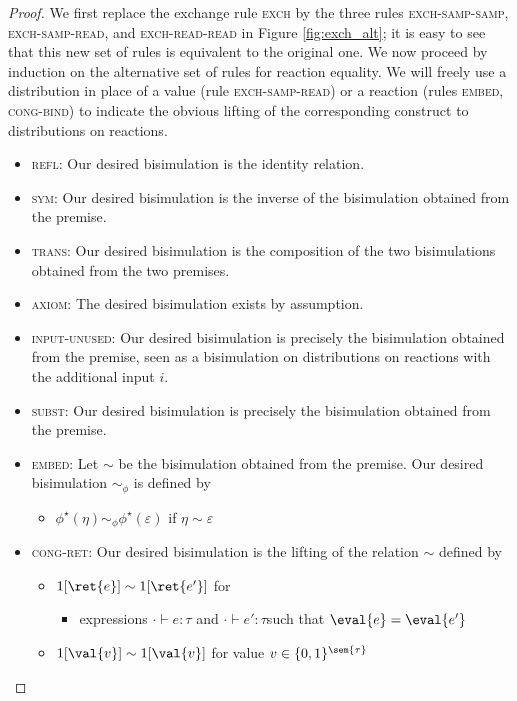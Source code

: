 \begin{proof}
We first replace the exchange rule \textsc{exch} by the three rules \textsc{exch-samp-samp}, \textsc{exch-samp-read}, and \textsc{exch-read-read} in Figure \ref{fig:exch_alt}; it is easy to see that this new set of rules is equivalent to the original one. We now proceed by induction on the alternative set of rules for reaction equality. We will freely use a distribution in place of a value (rule \textsc{exch-samp-read}) or a reaction (rules \textsc{embed}, \textsc{cong-bind}) to indicate the obvious lifting of the corresponding construct to distributions on reactions.

\begin{itemize}
\item \textsc{refl}: Our desired bisimulation is the identity relation.
\item \textsc{sym}: Our desired bisimulation is the inverse of the bisimulation obtained from the premise.
\item \textsc{trans}: Our desired bisimulation is the composition of the two bisimulations obtained from the two premises.
\item \textsc{axiom}: The desired bisimulation exists by assumption.
\item \textsc{input-unused}: Our desired bisimulation is precisely the bisimulation obtained from the premise, seen as a bisimulation on distributions on reactions with the additional input $i$.
\item \textsc{subst}: Our desired bisimulation is precisely the bisimulation obtained from the premise.
\item \textsc{embed}: Let $\sim$ be the bisimulation obtained from the premise. Our desired bisimulation $\sim_\phi$ is defined by
\begin{itemize}
\item $\phi^\star(\eta) \sim_\phi \phi^\star(\varepsilon)$ if $\eta \sim \varepsilon$
\end{itemize}
\item \textsc{cong-ret}: Our desired bisimulation is the lifting of the relation $\sim$ defined by
\begin{itemize}
\item $1[\ret{e}] \sim 1[\ret{e'}]$ for
\begin{itemize}
\item expressions $\cdot \vdash e : \tau$ and $\cdot \vdash e' : \tau$such that $\eval{e} = \eval{e'}$
\end{itemize}
\item $1[\val{v}] \sim 1[\val{v}]$ for value $v \in \{0,1\}^{\sem{\tau}}$

\end{itemize}
\end{itemize}
\end{proof}
